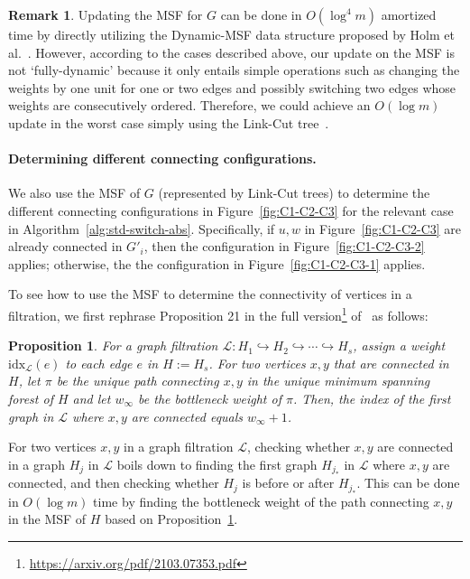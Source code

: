 \documentclass[letterpaper,11pt]{article}
\theoremstyle{mythmstyle}
\newtheorem{proposition}[theorem]{Proposition}
\theoremstyle{mydefstyle}
\newtheorem{remark}{Remark}
\theoremstyle{plain}
\newtheorem{proposition}[theorem]{Proposition}
\theoremstyle{definition}
\newtheorem{remark}{Remark}
\newcommand{\<}[1]{\langle #1\rangle}
\newcommand{\incto}{\hookrightarrow}
\newcommand{\idx}{\mathrm{idx}}
\newcommand{\Lcal}{\mathcal{L}}
\theoremstyle{definition}
\begin{document}
\begin{remark}
Updating the MSF for $G$  
can be done in $O(\log^4 m)$ amortized time
by directly utilizing the Dynamic-MSF data structure
proposed by Holm et al.~\cite{holm2001poly}.
However, according to the  cases described above,
our update on the MSF is not `fully-dynamic'
because it only entails simple operations such as 
changing the weights by one unit for one or two edges and possibly switching two edges
whose weights are consecutively ordered.
Therefore, we could achieve an $O(\log m)$ update
in the worst case simply using the Link-Cut tree~\cite{sleator1981data}.
\end{remark}


\paragraph{Determining different connecting configurations.}
We also use the MSF of $G$ (represented by Link-Cut trees) 
to determine the different connecting configurations
in Figure~\ref{fig:C1-C2-C3} for the relevant case in Algorithm~\ref{alg:std-switch-abs}.
Specifically, if $u,w$  in Figure~\ref{fig:C1-C2-C3}
are already connected in $G'_i$, then the configuration in
Figure~\ref{fig:C1-C2-C3-2} applies;
otherwise, the the configuration in
Figure~\ref{fig:C1-C2-C3-1} applies.

To see how to use the MSF to determine the connectivity of vertices
in a filtration, 
we first rephrase Proposition 21 in the full version\footnote{\url{https://arxiv.org/pdf/2103.07353.pdf}} of~\cite{dey2021computing} as follows: 
\begin{proposition}\label{prop:conn-msf}
For a graph filtration $\Lcal:H_1\incto H_2\incto \cdots \incto H_s$, 
assign a weight $\idx_\Lcal(e)$ to each edge $e$ in $H:=H_s$.
For two vertices $x,y$ that are connected in $H$, 
let $\pi$ be the unique path connecting $x,y$ in the unique minimum spanning forest
of $H$
and let $w_\infty$ be the bottleneck weight of $\pi$.
Then,
the index of the first graph in $\Lcal$ where $x,y$
are connected equals $w_\infty+1$.
\end{proposition}

For two vertices $x,y$ in a graph filtration $\Lcal$, 
checking whether $x,y$ are connected in a graph $H_j$ in $\Lcal$
boils down to finding the first graph $H_{j_*}$ in $\Lcal$ where $x,y$ are connected,
and then checking whether $H_j$ is before or after $H_{j_*}$.
This can be done in $O(\log m)$ time by finding the bottleneck weight 
of the path connecting $x,y$ in the MSF of $H$
based on Proposition~\ref{prop:conn-msf}.
\end{document}

